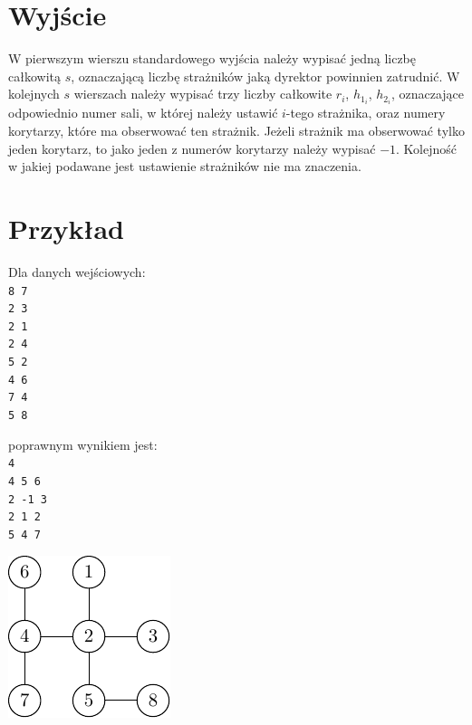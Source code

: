 \documentclass[10pt]{article}
\begin{document}

    \section*{Wyjście}
    
    W pierwszym wierszu standardowego wyjścia należy wypisać jedną liczbę całkowitą $s$, oznaczającą liczbę strażników jaką dyrektor powinnien zatrudnić. W kolejnych $s$ wierszach należy wypisać trzy liczby całkowite $r_{i}$, $h_{1_{i}}$, $h_{2_{i}}$, oznaczające odpowiednio numer sali, w której należy ustawić $i$-tego strażnika, oraz numery korytarzy, które ma obserwować ten strażnik. Jeżeli strażnik ma obserwować tylko jeden korytarz, to jako jeden z numerów korytarzy należy wypisać $-1$. Kolejność w jakiej podawane jest ustawienie strażników nie ma znaczenia.


    \section*{Przykład}
    
    \noindent
    \begin{minipage}[t]{0.5\textwidth}
        Dla danych wejściowych:\vspace{1ex}\\
        \texttt{8 7\\2 3\\2 1\\2 4\\5 2\\4 6\\7 4\\5 8}
    \end{minipage}
    \begin{minipage}[t]{0.5\textwidth}
        poprawnym wynikiem jest:\vspace{1ex}\\
        \texttt{4\\4 5 6\\2 -1 3\\2 1 2\\5 4 7}
    \end{minipage}
    
    \vspace{-2em}
    \begin{center}
        \includegraphics{strrys-1.pdf}
    \end{center}
    
\end{document}
